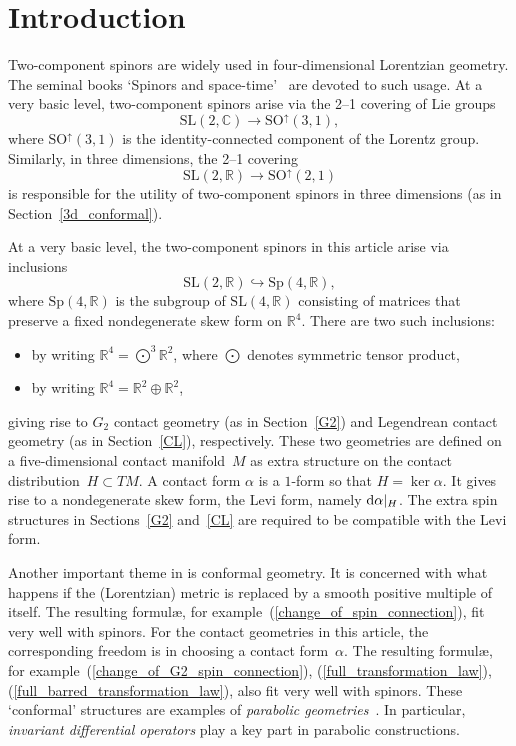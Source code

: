 \documentclass[pdftex]{sigma}%
\numberwithin{equation}{section}
\begin{document}
\renewcommand{\thefootnote}{\arabic{footnote}}
\setcounter{footnote}{0}

\section{Introduction}
Two-component spinors are widely used in four-dimensional Lorentzian geometry.
The seminal books `Spinors and space-time'~\cite{OT,NT} are devoted to such
usage. At a very basic level, two-component spinors arise via the 2--1 covering
of Lie groups
\[{\mathrm{SL}}(2,{\mathbb{C}})\longrightarrow{\mathrm{SO}}^\uparrow(3,1),\]
where ${\mathrm{SO}}^\uparrow(3,1)$ is the identity-connected component of the
Lorentz group. Similarly, in three dimensions, the 2--1 covering
\[{\mathrm{SL}}(2,{\mathbb{R}})\longrightarrow{\mathrm{SO}}^\uparrow(2,1)\]
is responsible for the utility of two-component spinors in three dimensions
(as in Section~\ref{3d_conformal}).

At a very basic level, the two-component spinors in this article arise via
inclusions
\[{\mathrm{SL}}(2,{\mathbb{R}})\hookrightarrow{\mathrm{Sp}}(4,{\mathbb{R}}),\]
where ${\mathrm{Sp}}(4,{\mathbb{R}})$ is the subgroup of
${\mathrm{SL}}(4,{\mathbb{R}})$ consisting of matrices that preserve a fixed
non\-degenerate skew form on ${\mathbb{R}}^4$. There are two such inclusions:
\begin{itemize}\itemsep=0pt
\item by writing ${\mathbb{R}}^4=\bigodot^3{\mathbb{R}}^2$, where $\bigodot$
denotes symmetric tensor product,
\item by writing ${\mathbb{R}}^4={\mathbb{R}}^2\oplus{\mathbb{R}}^2$,
\end{itemize}
giving rise to $G_2$ contact geometry (as in Section~\ref{G2}) and Legendrean
contact geometry (as in Section~\ref{CL}), respectively. These two geometries are
defined on a five-dimensional contact mani\-fold~$M$ as extra structure on the
contact distribution~$H\subset TM$. A contact form $\alpha$ is a $1$-form so
that $H=\ker\alpha$. It gives rise to a nondegenerate skew form, the Levi
form, namely ${\rm d}\alpha|_H$. The extra spin structures in Sections~\ref{G2} and~\ref{CL} are required to be compatible with the Levi form.

Another important theme in \cite{OT,NT} is conformal geometry. It is concerned
with what happens if the (Lorentzian) metric is replaced by a smooth positive
multiple of itself. The resulting formul{\ae}, for
example~(\ref{change_of_spin_connection}), fit very well with spinors. For the
contact geometries in this article, the corresponding freedom is in choosing a
contact form~$\alpha$. The resulting formul{\ae}, for
example~(\ref{change_of_G2_spin_connection}), (\ref{full_transformation_law}),
(\ref{full_barred_transformation_law}), also fit very well with spinors. These
`conformal' structures are examples of {\em parabolic geometries}~\cite{CS}.
In particular, {\em invariant differential operators} play a key part in
parabolic constructions.
\end{document}
